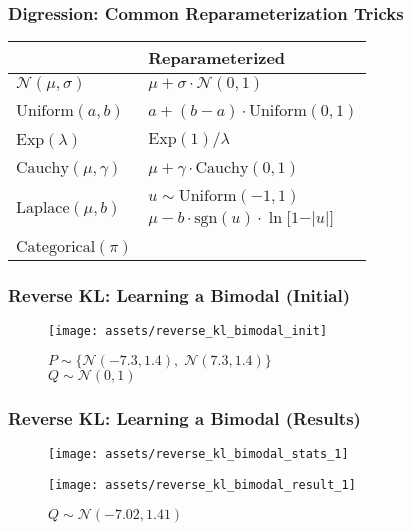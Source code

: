 \documentclass{beamer}
\newcommand{\xmark}{\textcolor{red}{\ding{55}}}
\begin{document}
\begin{frame}
  \frametitle{Digression: Common Reparameterization Tricks}
  \begin{center}
  \begin{tabular}{C{5cm}C{5cm}}
  \toprule
  {} & Reparameterized \\
  \midrule
  $\mathcal{N}(\mu, \sigma)$   &  $\mu + \sigma \cdot \mathcal{N}(0, 1)$ \\
  \\
  $\text{Uniform}(a, b)$   &  $a + (b - a) \cdot \text{Uniform}(0, 1)$ \\
  \\
  $\text{Exp}(\lambda)$   &  $\text{Exp}(1) / \lambda$ \\
  \\
  $\text{Cauchy}(\mu, \gamma)$   &  $\mu + \gamma \cdot \text{Cauchy}(0, 1)$ \\
  \\
    &  $u \sim \text{Uniform}(-1, 1)$ \\
                                          & $\mu - b \cdot \text{sgn}(u) \cdot \ln \big[ 1 - \vert u \vert \big]$ \\
                                          \\
  $\text{Categorical}(\pi)$\footnotemark & \xmark \\
  \bottomrule
  \end{tabular}
  \end{center}
\end{frame}

\begin{frame}
  \frametitle{Reverse KL: Learning a Bimodal (Initial)}
  \begin{figure}
    \centering
    \texttt{[image: assets/reverse\_kl\_bimodal\_init]}
    \caption{$P \sim \big\{\mathcal{N}(-7.3, 1.4), \; \mathcal{N}(7.3, 1.4) \big\}$\\$Q \sim \mathcal{N}(0, 1)$}
  \end{figure}
\end{frame}

\begin{frame}
  \frametitle{Reverse KL: Learning a Bimodal (Results)}
  \begin{figure}
    \centering
    \texttt{[image: assets/reverse\_kl\_bimodal\_stats\_1]}
  \end{figure}
  \begin{figure}
    \centering
    \texttt{[image: assets/reverse\_kl\_bimodal\_result\_1]}
    \caption{$Q \sim \mathcal{N}(-7.02, 1.41)$}
  \end{figure}
\end{frame}
\end{document}
